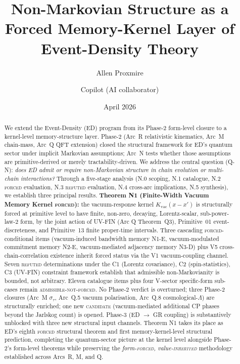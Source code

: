 \documentclass[11pt,a4paper]{article}
\title{Non-Markovian Structure as a Forced Memory-Kernel Layer of Event-Density Theory}
\author{Allen Proxmire \and Copilot (AI collaborator)}
\date{April 2026}
\begin{document}
\maketitle

\begin{abstract}
We extend the Event-Density (ED) program from its Phase-2 form-level closure to a kernel-level memory-structure layer. Phase-2 (Arc~R relativistic kinematics, Arc~M chain-mass, Arc~Q QFT extension) closed the structural framework for ED's quantum sector under implicit Markovian assumptions; Arc~N tests whether those assumptions are primitive-derived or merely tractability-driven. We address the central question (Q-N): \emph{does ED admit or require non-Markovian structure in chain evolution or multi-chain interactions?} Through a five-stage analysis (N.0 scoping, N.1 catalogue, N.2 \textsc{forced} evaluation, N.3 \textsc{refuted} evaluation, N.4 cross-arc implications, N.5 synthesis), we establish three principal results. \textbf{Theorem N1 (Finite-Width Vacuum Memory Kernel \textsc{forced}):} the vacuum-response kernel $K_\mathrm{vac}(x - x')$ is structurally forced at primitive level to have finite, non-zero, decaying, Lorentz-scalar, sub-power-law-2 form, by the joint action of UV-FIN (Arc Q Theorem~Q3), Primitive~01 event-discreteness, and Primitive~13 finite proper-time intervals. Three cascading \textsc{forced}-conditional items (vacuum-induced bandwidth memory N1-E, vacuum-modulated commitment memory N2-E, vacuum-mediated adjacency memory N3-D) plus V5 cross-chain-correlation existence inherit forced status via the V1 vacuum-coupling channel. Seven \textsc{refuted} determinations under the C1 (Lorentz covariance), C2 (spin-statistics), C3 (UV-FIN) constraint framework establish that admissible non-Markovianity is bounded, not arbitrary. Eleven catalogue items plus four V-sector specific-form sub-cases remain \textsc{admissible-not-forced}. No Phase-2 verdict is overturned; three Phase-2 closures (Arc~M $\sigma_\tau$, Arc~Q.5 vacuum polarisation, Arc~Q.8 cosmological-$\Lambda$) are structurally enriched; one new \textsc{candidate} (vacuum-mediated additional CP phases beyond the Jarlskog count) is opened. Phase-3 (ED $\to$ GR coupling) is substantively unblocked with three new structural input channels. Theorem N1 takes its place as ED's eighth \textsc{forced} structural theorem and first memory-kernel-level structural prediction, completing the quantum-sector picture at the kernel level alongside Phase-2's form-level theorems while preserving the \emph{form-\textsc{forced}, value-\textsc{inherited}} methodology established across Arcs~R, M, and Q.
\end{abstract}
\end{document}
